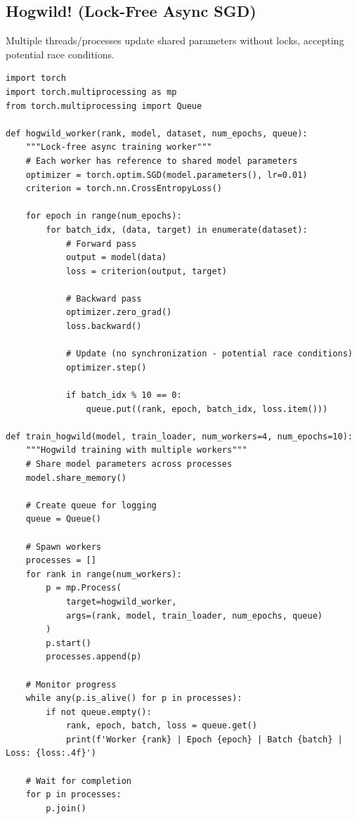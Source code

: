\subsection{Hogwild! (Lock-Free Async SGD)}

Multiple threads/processes update shared parameters without locks, accepting potential race conditions.

\begin{lstlisting}[style=python, caption=Hogwild implementation]
import torch
import torch.multiprocessing as mp
from torch.multiprocessing import Queue

def hogwild_worker(rank, model, dataset, num_epochs, queue):
    """Lock-free async training worker"""
    # Each worker has reference to shared model parameters
    optimizer = torch.optim.SGD(model.parameters(), lr=0.01)
    criterion = torch.nn.CrossEntropyLoss()

    for epoch in range(num_epochs):
        for batch_idx, (data, target) in enumerate(dataset):
            # Forward pass
            output = model(data)
            loss = criterion(output, target)

            # Backward pass
            optimizer.zero_grad()
            loss.backward()

            # Update (no synchronization - potential race conditions)
            optimizer.step()

            if batch_idx % 10 == 0:
                queue.put((rank, epoch, batch_idx, loss.item()))

def train_hogwild(model, train_loader, num_workers=4, num_epochs=10):
    """Hogwild training with multiple workers"""
    # Share model parameters across processes
    model.share_memory()

    # Create queue for logging
    queue = Queue()

    # Spawn workers
    processes = []
    for rank in range(num_workers):
        p = mp.Process(
            target=hogwild_worker,
            args=(rank, model, train_loader, num_epochs, queue)
        )
        p.start()
        processes.append(p)

    # Monitor progress
    while any(p.is_alive() for p in processes):
        if not queue.empty():
            rank, epoch, batch, loss = queue.get()
            print(f'Worker {rank} | Epoch {epoch} | Batch {batch} | Loss: {loss:.4f}')

    # Wait for completion
    for p in processes:
        p.join()
\end{lstlisting}

